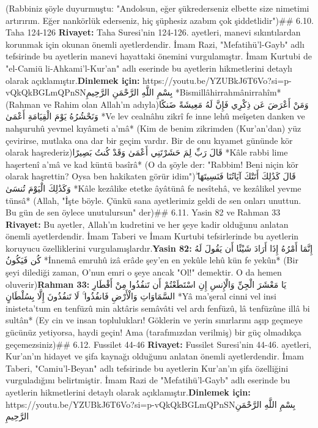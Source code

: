 \documentclass[12pt,a4paper]{article}
\begin{document}
{(Rabbiniz şöyle duyurmuştu: "Andolsun, eğer şükrederseniz elbette size nimetimi artırırım. Eğer nankörlük ederseniz, hiç şüphesiz azabım çok şiddetlidir")\#\# 6.10. Taha 124-126
\textbf{Rivayet:} Taha Suresi'nin 124-126. ayetleri, manevi sıkıntılardan korunmak için okunan önemli ayetlerdendir. İmam Razi, "Mefatihü'l-Gayb" adlı tefsirinde bu ayetlerin manevi hayattaki önemini vurgulamıştır. İmam Kurtubi de "el-Camiü li-Ahkami'l-Kur'an" adlı eserinde bu ayetlerin hikmetlerini detaylı olarak açıklamıştır.\textbf{Dinlemek için:} https://youtu.be/YZUBkJ6T6Vo?si=p-vQkQkBGLmQPnSNبِسْمِ اللَّهِ الرَّحْمَنِ الرَّحِيمِ
*Bismillâhirrahmânirrahîm*
(Rahman ve Rahim olan Allah'ın adıyla)وَمَنْ أَعْرَضَ عَن ذِكْرِي فَإِنَّ لَهُ مَعِيشَةً ضَنكًا وَنَحْشُرُهُ يَوْمَ الْقِيَامَةِ أَعْمَىٰ
*Ve lev cealnâhu zikrî fe inne lehû meîşeten danken ve nahşuruhû yevmel kıyâmeti a'mâ*
(Kim de benim zikrimden (Kur'an'dan) yüz çevirirse, mutlaka ona dar bir geçim vardır. Bir de onu kıyamet gününde kör olarak haşrederiz)قَالَ رَبِّ لِمَ حَشَرْتَنِي أَعْمَىٰ وَقَدْ كُنتُ بَصِيرًا
*Kâle rabbi lime haşertenî a'mâ ve kad küntü basîrâ*
(O da şöyle der: "Rabbim! Beni niçin kör olarak haşrettin? Oysa ben hakikaten görür idim")قَالَ كَذَٰلِكَ أَتَتْكَ آيَاتُنَا فَنَسِيتَهَا ۖ وَكَذَٰلِكَ الْيَوْمَ تُنسَىٰ
*Kâle kezâlike etetke âyâtünâ fe nesîtehâ, ve kezâlikel yevme tünsâ*
(Allah, "İşte böyle. Çünkü sana ayetlerimiz geldi de sen onları unuttun. Bu gün de sen öylece unutulursun" der)\#\# 6.11. Yasin 82 ve Rahman 33
\textbf{Rivayet:} Bu ayetler, Allah'ın kudretini ve her şeye kadir olduğunu anlatan önemli ayetlerdendir. İmam Taberi ve İmam Kurtubi tefsirlerinde bu ayetlerin koruyucu özelliklerini vurgulamışlardır.\textbf{Yasin 82:}
إِنَّمَا أَمْرُهُ إِذَا أَرَادَ شَيْئًا أَن يَقُولَ لَهُ كُن فَيَكُونُ
*İnnemâ emruhû izâ erâde şey'en en yekûle lehû kün fe yekûn*
(Bir şeyi dilediği zaman, O'nun emri o şeye ancak "Ol!" demektir. O da hemen oluverir)\textbf{Rahman 33:}
يَا مَعْشَرَ الْجِنِّ وَالْإِنسِ إِنِ اسْتَطَعْتُمْ أَن تَنفُذُوا مِنْ أَقْطَارِ السَّمَاوَاتِ وَالْأَرْضِ فَانفُذُوا ۚ لَا تَنفُذُونَ إِلَّا بِسُلْطَانٍ
*Yâ ma'şeral cinni vel insi inisteta'tum en tenfüzû min aktâris semâvâti vel ardı fenfüzû, lâ tenfüzûne illâ bi sultân*
(Ey cin ve insan toplulukları! Göklerin ve yerin sınırlarını aşıp geçmeye gücünüz yetiyorsa, haydi geçin! Ama (tarafımızdan verilmiş) bir güç olmadıkça geçemezsiniz)\#\# 6.12. Fussilet 44-46
\textbf{Rivayet:} Fussilet Suresi'nin 44-46. ayetleri, Kur'an'ın hidayet ve şifa kaynağı olduğunu anlatan önemli ayetlerdendir. İmam Taberi, "Camiu'l-Beyan" adlı tefsirinde bu ayetlerin Kur'an'ın şifa özelliğini vurguladığını belirtmiştir. İmam Razi de "Mefatihü'l-Gayb" adlı eserinde bu ayetlerin hikmetlerini detaylı olarak açıklamıştır.\textbf{Dinlemek için:} https://youtu.be/YZUBkJ6T6Vo?si=p-vQkQkBGLmQPnSNبِسْمِ اللَّهِ الرَّحْمَنِ الرَّحِيمِ
}
\end{document}
